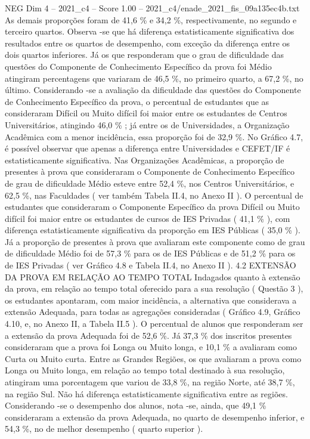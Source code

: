 \begin{textsample}{NEG Dim 4 – 2021\_c4 – Score 1.00 – 2021\_c4/enade\_2021\_fis\_09a135ec4b.txt}
As demais proporções foram de 41,6 \% e 34,2 \%, respectivamente, no segundo e terceiro quartos.
Observa -se que há diferença estatisticamente significativa dos resultados entre os quartos de desempenho, com exceção da diferença entre os dois quartos inferiores.
Já os que responderam que o grau de dificuldade das questões do Componente de Conhecimento Específico da prova foi Médio atingiram percentagens que variaram de 46,5 \%, no primeiro quarto, a 67,2 \%, no último.
Considerando -se a avaliação da dificuldade das questões do Componente de Conhecimento Específico da prova, o percentual de estudantes que as consideraram Difícil ou Muito difícil foi maior entre os estudantes de Centros Universitários, atingindo 46,0 \% ; já entre os de Universidades, a Organização Acadêmica com a menor incidência, essa proporção foi de 32,9 \%.
No Gráfico 4.7, é possível observar que apenas a diferença entre Universidades e CEFET/IF é estatisticamente significativa.
Nas Organizações Acadêmicas, a proporção de presentes à prova que consideraram o Componente de Conhecimento Específico de grau de dificuldade Médio esteve entre 52,4 \%, nos Centros Universitários, e 62,5 \%, nas Faculdades ( ver também Tabela II.4, no Anexo II ).
O percentual de estudantes que consideraram o Componente Específico da prova Difícil ou Muito difícil foi maior entre os estudantes de cursos de IES Privadas ( 41,1 \% ), com diferença estatisticamente significativa da proporção em IES Públicas ( 35,0 \% ).
Já a proporção de presentes à prova que avaliaram este componente como de grau de dificuldade Médio foi de 57,3 \% para os de IES Públicas e de 51,2 \% para os de IES Privadas ( ver Gráfico 4.8 e Tabela II.4, no Anexo II ). 4.2 EXTENSÃO DA PROVA EM RELAÇÃO AO TEMPO TOTAL Indagados quanto à extensão da prova, em relação ao tempo total oferecido para a sua resolução ( Questão 3 ), os estudantes apontaram, com maior incidência, a alternativa que considerava a extensão Adequada, para todas as agregações consideradas ( Gráfico 4.9, Gráfico 4.10, e, no Anexo II, a Tabela II.5 ).
O percentual de alunos que responderam ser a extensão da prova Adequada foi de 52,6 \%.
Já 37,3 \% dos inscritos presentes consideraram que a prova foi Longa ou Muito longa, e 10,1 \% a avaliaram como Curta ou Muito curta.
Entre as Grandes Regiões, os que avaliaram a prova como Longa ou Muito longa, em relação ao tempo total destinado à sua resolução, atingiram uma porcentagem que variou de 33,8 \%, na região Norte, até 38,7 \%, na região Sul.
Não há diferença estatisticamente significativa entre as regiões.
Considerando -se o desempenho dos alunos, nota -se, ainda, que 49,1 \% consideraram a extensão da prova Adequada, no quarto de desempenho inferior, e 54,3 \%, no de melhor desempenho ( quarto superior ).

\end{textsample}
